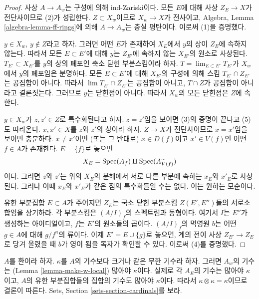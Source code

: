 \begin{proof}
사상 $A \to A_w$는 구성에 의해 ind-Zariski이다.
모든 $E$에 대해 사상 $Z_E \to X$가 전단사이므로 (2)가 성립한다.
$Z \subset X_w$이므로 $X_w \to X$가 전사이고,
Algebra, Lemma \ref{algebra-lemma-ff-rings}에 의해
$A \to A_w$는 충실 평탄이다. 이로써 (1)을 증명했다.

\medskip\noindent
$y \in X_w$, $y \not \in Z$라고 하자.
그러면 어떤 $E$가 존재하여 $X_E$에서 $y$의 상이 $Z_E$에 속하지 않는다.
따라서 모든 $E \subset E'$에 대해 $y$는 $Z_{E'}$에 속하지 않는
$X_{E'}$의 원소로 사상된다.
$T_{E'} \subset X_{E'}$를 $y$의 상의 폐포인 축소 닫힌 부분스킴이라 하자.
$T = \lim_{E \subset E'} T_{E'}$가 $X_w$에서 $y$의 폐포임은 분명하다.
모든 $E \subset E'$에 대해 $X_{E'}$의 구성에 의해
스킴 $T_{E'} \cap Z_{E'}$는 공집합이 아니다.
따라서 $\lim T_{E'} \cap Z_{E'}$는 공집합이 아니고,
$T \cap Z$가 공집합이 아니라고 결론짓는다.
그러므로 $y$는 닫힌점이 아니다.
따라서 $X_w$의 모든 닫힌점은 $Z$에 속한다.

\medskip\noindent
$y \in X_w$가 $z, z' \in Z$로 특수화된다고 하자.
$z = z'$임을 보이면 (3)의 증명이 끝나고 (5)도 따라온다.
$x, x' \in X$를 $z$와 $z'$의 상이라 하자.
$Z \to X$가 전단사이므로 $x = x'$임을 보이면 충분하다.
$x \not = x'$이면 (또는 그 반대로) $x \in D(f)$이고
$x' \in V(f)$인 어떤 $f \in A$가 존재한다.
$E = \{f\}$로 놓으면
$$
X_E = \mathop{\mathrm{Spec}}(A_f) \amalg \mathop{\mathrm{Spec}}(A_{V(f)}^\sim)
$$
이다.
그러면 $z$와 $z'$는 위의 $X_E$의 분해에서 서로 다른 부분에 속하는
$x_E$와 $x'_E$로 사상된다.
그러나 이때 $x_E$와 $x'_E$가 같은 점의 특수화들일 수는 없다.
이는 원하는 모순이다.

\medskip\noindent
유한 부분집합 $E \subset A$가 주어지면 $Z_E$는
국소 닫힌 부분스킴 $Z(E', E'')$들의 서로소 합임을 상기하라.
각 부분스킴은 $(A/I)_f$의 스펙트럼과 동형이다.
여기서 $I$는 $E''$가 생성하는 아이디얼이고,
$f$는 $E'$의 원소들의 곱이다.
$(A/I)_f$의 멱영원 $b$는 어떤 $g \in A$에 대해
$g/f^n$의 류이다. 이제 $E' = E \cup \{g\}$로 놓으면,
계의 전이 사상 $Z_{E'} \to Z_E$로 당겨 올렸을 때 $b$가 영이 됨을
독자가 확인할 수 있다. 이로써 (4)를 증명했다.
\end{proof}

\begin{remark}
\label{remark-size-w}
$A$를 환이라 하자.
$\kappa$를 $A$의 기수보다 크거나 같은 무한 기수라 하자.
그러면 $A_w$의 기수는 (Lemma \ref{lemma-make-w-local})
많아야 $\kappa$이다. 실제로 각 $A_E$의 기수는 많아야 $\kappa$이고,
$A$의 유한 부분집합들의 집합의 기수도 많아야 $\kappa$이다.
따라서 $\kappa \otimes \kappa = \kappa$이므로 결론이 따른다.
Sets, Section \ref{sets-section-cardinals}를 보라.
\end{remark}

